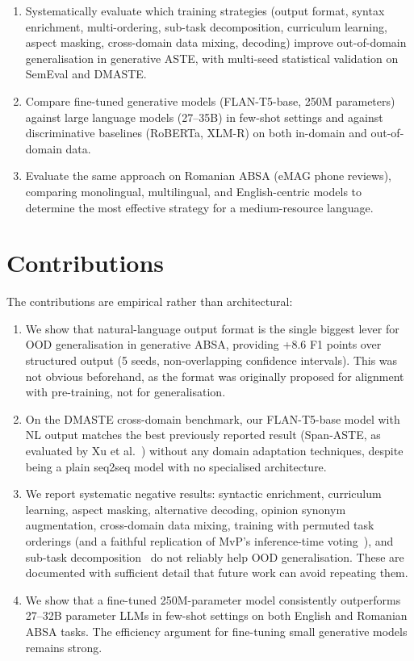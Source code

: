 \documentclass[12pt,a4paper]{report}
\begin{document}
\begin{enumerate}
    \item Systematically evaluate which training strategies (output format, syntax enrichment, multi-ordering, sub-task decomposition, curriculum learning, aspect masking, cross-domain data mixing, decoding) improve out-of-domain generalisation in generative ASTE, with multi-seed statistical validation on SemEval and DMASTE.
    
    \item Compare fine-tuned generative models (FLAN-T5-base, 250M parameters) against large language models (27--35B) in few-shot settings and against discriminative baselines (RoBERTa, XLM-R) on both in-domain and out-of-domain data.
    
    \item Evaluate the same approach on Romanian ABSA (eMAG phone reviews), comparing monolingual, multilingual, and English-centric models to determine the most effective strategy for a medium-resource language.
\end{enumerate}


\section{Contributions}

The contributions are empirical rather than architectural:

\begin{enumerate}
    \item We show that natural-language output format is the single biggest lever for OOD generalisation in generative ABSA, providing +8.6 F1 points over structured output (5 seeds, non-overlapping confidence intervals). This was not obvious beforehand, as the format was originally proposed for alignment with pre-training, not for generalisation.
    
    \item On the DMASTE cross-domain benchmark, our FLAN-T5-base model with NL output matches the best previously reported result (Span-ASTE, as evaluated by Xu et al.~\cite{xu2023dmaste}) without any domain adaptation techniques, despite being a plain seq2seq model with no specialised architecture.
    
    \item We report systematic negative results: syntactic enrichment, curriculum learning, aspect masking, alternative decoding, opinion synonym augmentation, cross-domain data mixing, training with permuted task orderings (and a faithful replication of MvP's inference-time voting~\cite{gou2023mvp}), and sub-task decomposition~\cite{xie2025star} do not reliably help OOD generalisation. These are documented with sufficient detail that future work can avoid repeating them.
    
    \item We show that a fine-tuned 250M-parameter model consistently outperforms 27--32B parameter LLMs in few-shot settings on both English and Romanian ABSA tasks. The efficiency argument for fine-tuning small generative models remains strong.
\end{enumerate}
\end{document}
